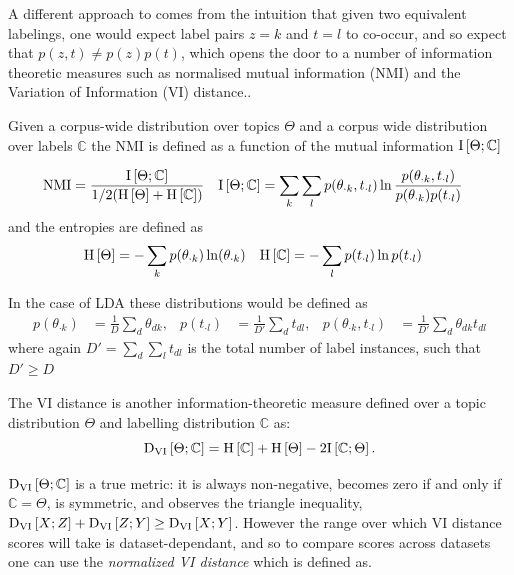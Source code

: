 A different approach to comes from the intuition that given two equivalent labelings, one would expect label pairs $z=k$ and $t=l$ to co-occur, and so expect that $p(z,t) \neq p(z)p(t)$, which opens the door to a number of information theoretic measures such as normalised mutual information (NMI) and the Variation of Information (VI) distance..

\newcommand{\TopDist}{\Theta}
\newcommand{\LabDist}{\mathbb{C}}
\newcommand{\NMI}{\text{NMI}}

Given a corpus-wide distribution over topics $\TopDist$ and a corpus wide distribution over labels $\LabDist$ the NMI is defined as a function of the mutual information $\mut{\TopDist}{\LabDist}$

\begin{align}
\NMI & = \frac{\mut{\TopDist}{\LabDist}}{1/2(\ent{\TopDist} + \ent{\LabDist})} &
\mut{\TopDist}{\LabDist} & = \sum_k \sum_l p(\theta_{\cdot k}, t_{\cdot l}) \ln \frac{p(\theta_{\cdot k}, t_{\cdot l})}{p(\theta_{\cdot k})p(t_{\cdot l})}
\end{align}
and the entropies are defined as
\begin{align}
\ent{\TopDist} & = - \sum_k p(\theta_{\cdot k}) \ln (\theta_{\cdot k}) &
\ent{\LabDist} & = - \sum_l p(t_{\cdot l}) \ln p(t_{\cdot l})
\end{align}

In the case of LDA these distributions would be defined as
\begin{align}
p(\theta_{\cdot k}) & =  \frac{1}{D} \sum_d \theta_{dk} ,&
p(t_{\cdot l}) &= \frac{1}{D'} \sum_d t_{dl} ,& 
p(\theta_{\cdot k}, t_{\cdot l}) & = \frac{1}{D'} \sum_d \theta_{dk} t_{dl}
\end{align}
where again $D' = \sum_d \sum_l t_{dl}$ is the total number of label instances, such that $D' \geq D$


The VI distance\cite{Meila2003} is another information-theoretic measure defined over a topic distribution $\TopDist$ and labelling distribution $\LabDist$ as:
\begin{equation}
\dvi{\TopDist}{\LabDist} = \ent{\LabDist} + \ent{\TopDist} - 2 \mut{\LabDist}{\TopDist}.
\end{equation}

$\dvi{\TopDist}{\LabDist}$ is a true metric: it is always non-negative, becomes zero if and only if $\LabDist = \TopDist$, is symmetric, and observes the triangle inequality, $\text{D}_\text{VI} \left[ X; Z \right] + \text{D}_\text{VI} \left[ Z; Y \right] \geq \text{D}_\text{VI} \left[ X; Y \right]$. However the range over which VI distance scores will take is dataset-dependant, and so to compare scores across datasets one can use the \emph{normalized VI distance}\cite{Reichart2009} which is defined as. 

